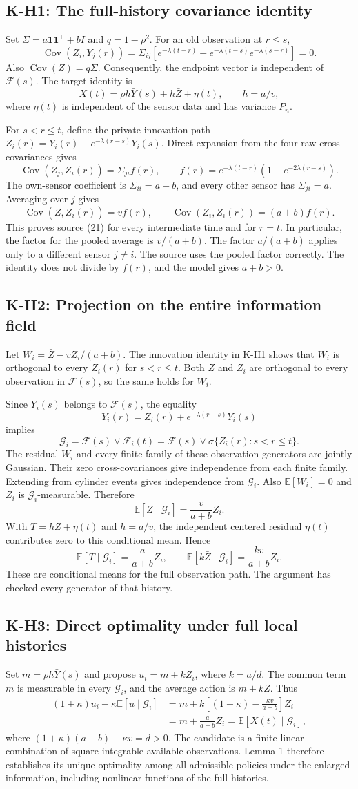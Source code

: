 \documentclass[11pt,letterpaper]{article}
\newcommand{\E}{\mathbb E}
\newcommand{\Cov}{\operatorname{Cov}}
\newcommand{\one}{\mathbf1}
\newcommand{\G}{\mathcal G}
\newcommand{\F}{\mathcal F}
\newcommand{\calculation}[2]{\subsection{#1: #2}}
\begin{document}
\calculation{K-H1}{The full-history covariance identity}
Set $\Sigma=a\one\one^\top+bI$ and $q=1-\rho^2$. For an old observation at $r\le s$,
\[
\Cov(Z_i,Y_j(r))
=\Sigma_{ij}\left[e^{-\lambda(t-r)}-
e^{-\lambda(t-s)}e^{-\lambda(s-r)}\right]=0.
\]
Also $\Cov(Z)=q\Sigma$. Consequently, the endpoint vector is independent of $\F(s)$. The target identity is
\[
X(t)=\rho h\bar Y(s)+h\bar Z+\eta(t),\qquad h=a/v,
\]
where $\eta(t)$ is independent of the sensor data and has variance $P_n$.

For $s<r\le t$, define the private innovation path $Z_i(r)=Y_i(r)-e^{-\lambda(r-s)}Y_i(s)$. Direct expansion from the four raw cross-covariances gives
\[
\Cov(Z_j,Z_i(r))=\Sigma_{ji}f(r),\qquad
f(r)=e^{-\lambda(t-r)}(1-e^{-2\lambda(r-s)}).
\]
The own-sensor coefficient is $\Sigma_{ii}=a+b$, and every other sensor has $\Sigma_{ji}=a$. Averaging over $j$ gives
\[
\Cov(\bar Z,Z_i(r))=v f(r),\qquad
\Cov(Z_i,Z_i(r))=(a+b)f(r).
\]
This proves source (21) for every intermediate time and for $r=t$. In particular, the factor for the pooled average is $v/(a+b)$. The factor $a/(a+b)$ applies only to a different sensor $j\ne i$. The source uses the pooled factor correctly. The identity does not divide by $f(r)$, and the model gives $a+b>0$.

\calculation{K-H2}{Projection on the entire information field}
Let $W_i=\bar Z-vZ_i/(a+b)$. The innovation identity in K-H1 shows that $W_i$ is orthogonal to every $Z_i(r)$ for $s<r\le t$. Both $\bar Z$ and $Z_i$ are orthogonal to every observation in $\F(s)$, so the same holds for $W_i$.

Since $Y_i(s)$ belongs to $\F(s)$, the equality
\[
Y_i(r)=Z_i(r)+e^{-\lambda(r-s)}Y_i(s)
\]
implies
\[
\G_i=\F(s)\vee\F_i(t)
=\F(s)\vee\sigma\{Z_i(r):s<r\le t\}.
\]
The residual $W_i$ and every finite family of these observation generators are jointly Gaussian. Their zero cross-covariances give independence from each finite family. Extending from cylinder events gives independence from $\G_i$. Also $\E[W_i]=0$ and $Z_i$ is $\G_i$-measurable. Therefore
\[
\E[\bar Z\mid\G_i]=\frac{v}{a+b}Z_i.
\tag{A3}
\]
With $T=h\bar Z+\eta(t)$ and $h=a/v$, the independent centered residual $\eta(t)$ contributes zero to this conditional mean. Hence
\[
\E[T\mid\G_i]=\frac{a}{a+b}Z_i,\qquad
\E[k\bar Z\mid\G_i]=\frac{kv}{a+b}Z_i.
\]
These are conditional means for the full observation path. The argument has checked every generator of that history.

\calculation{K-H3}{Direct optimality under full local histories}
Set $m=\rho h\bar Y(s)$ and propose $u_i=m+kZ_i$, where $k=a/d$. The common term $m$ is measurable in every $\G_i$, and the average action is $m+k\bar Z$. Thus
\begin{align*}
(1+\kappa)u_i-\kappa\E[\bar u\mid\G_i]
&=m+k\left[(1+\kappa)-\frac{\kappa v}{a+b}\right]Z_i\\
&=m+\frac{a}{a+b}Z_i
=\E[X(t)\mid\G_i],
\end{align*}
where $(1+\kappa)(a+b)-\kappa v=d>0$. The candidate is a finite linear combination of square-integrable available observations. Lemma 1 therefore establishes its unique optimality among all admissible policies under the enlarged information, including nonlinear functions of the full histories.
\end{document}
